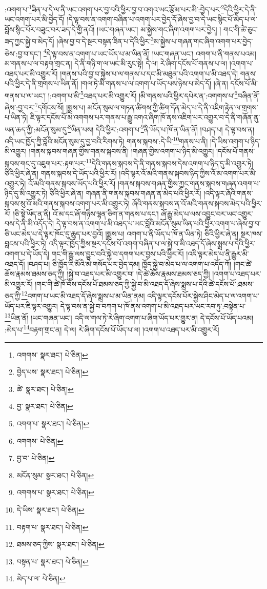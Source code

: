 :འགག་པ་\footnote{འགགས་  སྣར་ཐང་།  པེ་ཅིན། }ཟིན་པ་དེ་ལ་ནི་ཡང་འགག་པར་བྱ་བའི་ཕྱིར་བྱ་བ་འགའ་ཡང་རྩོམ་པར་མི་:བྱེད་པར་\footnote{བྱེད་པས་  སྣར་ཐང་།  པེ་ཅིན། }དེའི་ཕྱིར་དེ་ནི་ཡང་འགག་པར་མི་བྱེད་དོ། །དེ་ལྟ་བས་ན་འགག་བཞིན་པ་འགག་པར་བྱེད་དོ་ཞེས་བྱ་བ་དེ་ཡང་སྙིང་པོ་མེད་པ་ལ་བློས་སྙིང་པོར་བཟུང་བར་ཟད་དེ་གྱི་ནའོ། །ཡང་གཞན་ཡང་། མ་སྐྱེས་གང་ཞིག་འགག་པར་བྱེད། །
གང་གི་ཚེ་ཅུང་ཟད་ཀྱང་སྐྱེ་བ་མེད་དོ། །ཞེས་བྱ་བ་དེ་སྔར་བསྟན་ཟིན་པ་དེའི་ཕྱིར་\footnote{ཚེ་  སྣར་ཐང་།  པེ་ཅིན། }མ་སྐྱེས་པ་གཞན་གང་ཞིག་འགག་པར་བྱེད་ཅེས་:བྱ་བ་དང་། \footnote{བྱ་  སྣར་ཐང་།  པེ་ཅིན། }དེ་ལྟ་བས་ན་འགག་པ་ཡང་ཡོད་པ་མ་ཡིན་ནོ། །ཡང་གཞན་ཡང་། འགག་པ་ནི་གནས་པའམ། མ་གནས་པ་ལ་བརྟག་གྲང་ན། དེ་ནི་གཉི་ག་ལ་ཡང་མི་རུང་སྟེ། དེ་ལ། རེ་ཞིག་དངོས་པོ་གནས་པ་ལ། །འགག་པ་འཐད་པར་མི་འགྱུར་རོ། །གནས་པའི་བྱ་བ་སྐྱེས་པ་ལ་གནས་པ་དང་མི་མཐུན་པའི་འགག་པ་མི་འཐད་དེ། གནས་པའི་ཕྱིར་དེ་ནི་གྲགས་པ་ཡིན་ནོ། །གལ་ཏེ་མི་གནས་པ་ལ་འགག་པ་ཡོད་པས་ཉེས་པ་མེད་དོ། །ཞེ་ན། དངོས་པོ་མི་གནས་པ་ལ་ཡང་། །:འགག་པ་མི་\footnote{འགག་པ་  སྣར་ཐང་།  པེ་ཅིན། }འཐད་པར་མི་འགྱུར་རོ། །མི་གནས་པའི་ཕྱིར་དཔེར་ན་:འགགས་པ་\footnote{འགགས་  པེ་ཅིན། }བཞིན་ནོ་ཞེས་:བྱ་བར་\footnote{བྱ་བ་  པེ་ཅིན། }དགོངས་སོ། །སྨྲས་པ། མངོན་སུམ་ལ་གཏན་ཚིགས་ཀྱི་ཚིག་དོན་མེད་པ་དེ་ནི་འཇིག་རྟེན་ལ་གྲགས་པ་ཡིན་ཏེ། ཇི་ལྟར་དངོས་པོ་མ་འགགས་པར་གནས་པ་རྒྱུ་འགའ་ཞིག་ཁོ་ནས་འཇིག་པར་འགྱུར་བ་དེ་ནི་གཞོན་ནུ་ཡན་ཆད་ཀྱི་:མངོན་སུམ་དུ་\footnote{མངོན་སུམ་  སྣར་ཐང་།  པེ་ཅིན། }ཡིན་པས། དེའི་ཕྱིར་:འགག་པ་\footnote{འགགས་པ་  སྣར་ཐང་།  པེ་ཅིན། }ནི་ཡོད་པ་ཁོ་ན་ཡིན་ནོ། །བཤད་པ། དེ་ལྟ་བས་ན། འདི་ཡང་ཁྱོད་ཀྱི་བློའི་མངོན་སུམ་དུ་བྱ་བའི་རིགས་ཏེ། གནས་སྐབས་:དེ་ཡི་\footnote{དེ་ཡིས་  སྣར་ཐང་།  པེ་ཅིན། }གནས་པ་ནི། །དེ་ཡིས་འགག་པ་ཉིད་མི་འགྱུར། །གནས་སྐབས་གཞན་གྱིས་གནས་སྐབས་ནི། །གཞན་གྱིས་འགག་པ་ཉིད་མི་འགྱུར། །དངོས་པོ་གནས་སྐབས་གང་དུ་འཇུག་པར་:རྟག་པར་\footnote{བརྟག་པ་  སྣར་ཐང་།  པེ་ཅིན། }དེའི་གནས་སྐབས་དེ་ནི་གནས་སྐབས་དེས་འགག་པ་ཉིད་དུ་མི་འགྱུར་ཏེ། ཅིའི་ཕྱིར་ཞེ་ན། གནས་སྐབས་དེ་ཡོད་པའི་ཕྱིར་རོ། །འདི་ལྟར་འོ་མའི་གནས་སྐབས་ཉིད་ཀྱིས་འོ་མ་འགག་པར་མི་འགྱུར་ཏེ། འོ་མའི་གནས་སྐབས་ཡོད་པའི་ཕྱིར་རོ། །གནས་སྐབས་གཞན་གྱིས་ཀྱང་གནས་སྐབས་གཞན་འགག་པ་ཉིད་དུ་མི་འགྱུར་ཏེ། ཅིའི་ཕྱིར་ཞེ་ན། གཞན་ནི་གནས་སྐབས་གཞན་ན་མེད་པའི་ཕྱིར་རོ། །འདི་ལྟར་ཞོའི་གནས་སྐབས་སུ་འོ་མའི་གནས་སྐབས་འགག་པར་མི་འགྱུར་ཏེ། ཞོའི་གནས་སྐབས་ན་འོ་མའི་གནས་སྐབས་མེད་པའི་ཕྱིར་རོ། །ཅི་སྟེ་ཡོད་ན་ནི། འོ་མ་དང་ཞོ་གཉིས་ལྷན་ཅིག་ན་གནས་པ་དང་། ཞོ་རྒྱུ་མེད་པ་ལས་འབྱུང་བར་ཡང་འགྱུར་བས་དེ་ནི་མི་འདོད་དེ། དེ་ལྟ་བས་ན་འགག་པ་མི་འཐད་པ་ཡང་བློའི་མངོན་སུམ་ཡིན་པའི་ཕྱིར་འགག་པ་ཞེས་བྱ་བ་ཅི་ཡང་མེད་པ་དེ་ལྟར་ཁོང་དུ་ཆུད་པར་བྱའོ། །སྨྲས་པ། འགག་པ་ནི་ཡོད་པ་ཁོ་ན་ཡིན་ཏེ། ཅིའི་ཕྱིར་ཞེ་ན། སྔར་ཁས་བླངས་པའི་ཕྱིར་ཏེ། འདི་ལྟར་ཁྱོད་ཀྱིས་སྔར་དངོས་པོ་འགག་བཞིན་པ་ལ་སྐྱེ་བ་མི་འཐད་དོ་ཞེས་སྨྲས་པ་དེའི་ཕྱིར་འགག་པ་དེ་ཡོད་དེ། གང་གི་རྒྱུ་ལས་བྱུང་བའི་སྐྱེ་བ་དགག་པར་བྱས་པའི་ཕྱིར་རོ། །འདི་ལྟར་མེད་པ་ནི་རྒྱུར་མི་འཐད་དོ། །བཤད་པ། ཅི་ཁྱོད་རི་མོའི་མེ་གསོད་པར་བྱེད་དམ། ཁྱོད་སྐྱེ་བ་མེད་པ་ལ་འགག་པ་འདོད་ཀོ། །གང་ཚེ་ཆོས་རྣམས་ཐམས་ཅད་ཀྱི། །སྐྱེ་བ་འཐད་པར་མི་འགྱུར་བ། །དེ་ཚེ་ཆོས་རྣམས་ཐམས་ཅད་ཀྱི། །འགག་པ་འཐད་པར་མི་འགྱུར་རོ། །གང་གི་ཚེ་ཁོ་བོས་དངོས་པོ་ཐམས་ཅད་ཀྱི་སྐྱེ་བ་མི་འཐད་དོ་ཞེས་སྨྲས་པ་དེའི་ཚེ་དངོས་པོ་:ཐམས་ཅད་ཀྱི་\footnote{ཐམས་ཅད་ཀྱིས་  སྣར་ཐང་།  པེ་ཅིན། }འགག་པ་ཡང་མི་འཐད་དོ་ཞེས་སྨྲས་པ་མ་ཡིན་ནམ། འདི་ལྟར་དངོས་པོར་སྐྱེས་ཤིང་མེད་པ་ལ་འགག་པ་ཡོད་པར་ཇི་ལྟར་འགྱུར། དེ་ལྟ་བས་ན་སྐྱེ་བ་བཀག་པ་ཁོ་ནས་འགག་པ་མི་འཐད་པར་ཡང་རབ་ཏུ་:བསྟེན་པ་\footnote{བསྟན་པ་  སྣར་ཐང་།  པེ་ཅིན། }ཡིན་ནོ། །ཡང་གཞན་ཡང་། འདི་ལ་གལ་ཏེ་རེ་ཞིག་འགག་པ་ཞིག་ཡོད་པར་གྱུར་ན། དེ་དངོས་པོ་ཡོད་པའམ། :མེད་པ་\footnote{མེད་པ་ལ་  པེ་ཅིན། }བརྟག་གྲང་ན། དེ་ལ། རེ་ཞིག་དངོས་པོ་ཡོད་པ་ལ། །འགག་པ་འཐད་པར་མི་འགྱུར་རོ། 
